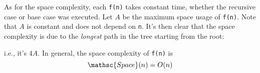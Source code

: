 As for the space complexity,
each \verb!f(n)! takes constant time,
whether the recursive case or base case was executed.
Let $A$ be the maximum space usage of \verb!f(n)!.
Note that $A$ is constant and does not depend on \verb!n!.
It's then clear that the space complexity is due to the
\textit{longest} path in the tree starting from the root:

i.e., it's $4A$.
In general, the space complexity of \verb!f(n)! is
\[
\mathsc{Space}(n) = O(n)
\]

\newpage

